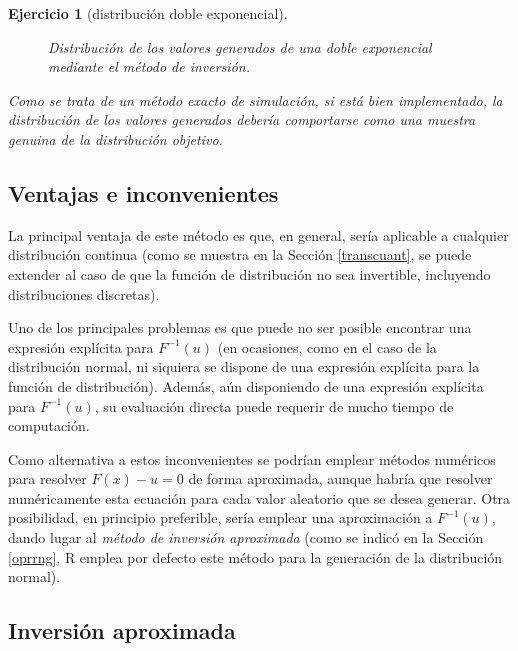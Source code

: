 \documentclass[
]{book}
\theoremstyle{break}
\newtheorem{exercise}{Ejercicio}[chapter]
\theoremstyle{nonumberplain}
\begin{document}
\begin{exercise}[distribución doble exponencial]
\begin{enumerate}
\begin{figure}[!htb]
{  }

  \caption{Distribución de los valores generados de una doble exponencial mediante el método de inversión.}\label{fig:ddexp-inv}
  \end{figure}

  Como se trata de un método exacto de simulación, si está bien implementado, la distribución de los valores generados debería comportarse como una muestra genuina de la distribución objetivo.
\end{enumerate}

\end{exercise}

\hypertarget{ventajas-e-inconvenientes}{%
\subsection{Ventajas e inconvenientes}\label{ventajas-e-inconvenientes}}

La principal ventaja de este método es que, en general, sería aplicable a cualquier distribución continua (como se muestra en la Sección \ref{transcuant}, se puede extender al caso de que la función de distribución no sea invertible, incluyendo distribuciones discretas).

Uno de los principales problemas es que puede no ser posible encontrar una expresión explícita para \(F^{-1}\left( u\right)\) (en ocasiones, como en el caso de la distribución normal, ni siquiera se dispone de una expresión explícita para la función de distribución).
Además, aún disponiendo de una expresión explícita para \(F^{-1}\left( u\right)\), su evaluación directa puede requerir de mucho tiempo de computación.

Como alternativa a estos inconvenientes se podrían emplear métodos numéricos para resolver \(F(x) - u = 0\) de forma aproximada, aunque habría que resolver numéricamente esta ecuación para cada valor aleatorio que se desea generar.
Otra posibilidad, en principio preferible, sería emplear una aproximación a \(F^{-1}\left( u\right)\), dando lugar al \emph{método de inversión aproximada} (como se indicó en la Sección \ref{oprrng}, R emplea por defecto este método para la generación de la distribución normal).

\hypertarget{inversiuxf3n-aproximada}{%
\subsection{Inversión aproximada}\label{inversiuxf3n-aproximada}}
\end{document}
